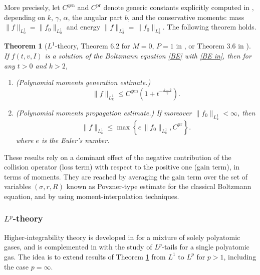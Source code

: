 \documentclass[11pt,a4paper]{amsart}
\newcommand{\g}{\gamma}
\newcommand{\param}{ \sigma, r, R}
\newcommand{\Cpr}{C^{\text{pr}}}
\newtheorem{theorem}{Theorem}
\begin{document}
More precisely, let $C^{\text{gen}}$ and $\Cpr$ denote generic constants explicitly computed in \cite{MC-Alonso-Gamba}, depending on $k$, $\gamma$, $\alpha$, the angular part $b$, and the conservative moments: mass  $\| f \|_{L^1_0} = \| f_0 \|_{L^1_0}$ and energy $\| f \|_{L^1_2} = \| f_0 \|_{L^1_2}$. The following theorem holds.
\begin{theorem}[$L^1$-theory, Theorem 6.2 for $M=0$, $P=1$ in \cite{MC-Alonso-Gamba}, or Theorem 3.6 in \cite{MC-Alonso-Pesaro}]\label{Th L1} If $f(t,v,I)$ is a solution of the Boltzmann equation \eqref{BE}  with \eqref{BE in}, then for  any $t>0$ and $k>2$,
		\begin{enumerate}
		\item (Polynomial moments generation estimate.) 
\begin{equation}\label{poly gen}
	\| f \|_{L^1_k} \leq C^{\text{gen}} \left(1  +  t^{-\frac{k-2}{\g}} \right). %
\end{equation}
		\item (Polynomial moments propagation estimate.) If moreover $	\| f_0 \|_{L^1_k} < \infty$,  then
		\begin{equation}\label{poly prop}
			\| f \|_{L^1_k} \leq \max \left\{  e \,	\| f_0 \|_{L^1_k}, \Cpr \right\}.%
		\end{equation}
where	$e$ is the Euler's number.
	\end{enumerate}
\end{theorem}
These results rely on a dominant effect of the negative contribution of the collision operator (loss term) with respect to the positive one (gain term), in terms of moments. They are reached by averaging the gain term over the set of variables $(\param)$  known as Povzner-type estimate for the classical Boltzmann equation, and by using    moment-interpolation techniques. 




 

\subsubsection{$L^p$-theory}


Higher-integrability theory is developed in \cite{MC-Alonso-Lp} for a mixture of solely polyatomic gases, and is complemented in \cite{MC-Alonso-Pesaro} with the study of $L^p$-tails for a single polyatomic gas. The idea is to extend  results of Theorem  \ref{Th L1} from $L^1$ to $L^p$ for $p> 1$, including the case $p=\infty$. 
\end{document}
